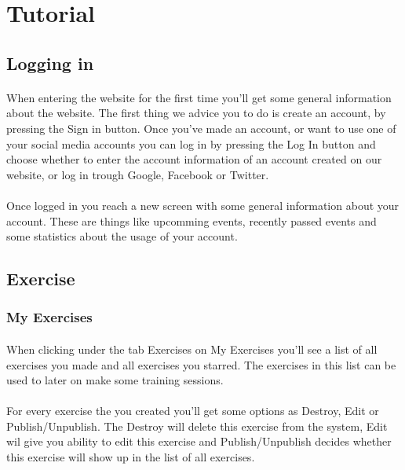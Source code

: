 \documentclass[11pt,a4paper]{scrartcl}
\begin{document}
\section{Tutorial}
\subsection{Logging in}
\paragraph{}When entering the website for the first time you'll get some general information about the website. The first thing we advice you to do is create an account, by pressing the Sign in button. Once you've made an account, or want to use one of your social media accounts you can log in by pressing the Log In button and choose whether to enter the account information of an account created on our website, or log in trough Google, Facebook or Twitter.
\paragraph{}Once logged in you reach a new screen with some general information about your account. These are things like upcomming events, recently passed events and some statistics about the usage of your account.

\subsection{Exercise}
\subsubsection{My Exercises}
\paragraph{}When clicking under the tab Exercises on My Exercises you'll see a list of all exercises you made and all exercises you starred. The exercises in this list can be used to later on make some training sessions.
\paragraph{}For every exercise the you created you'll get some options as Destroy, Edit or Publish/Unpublish. The Destroy will delete this exercise from the system, Edit wil give you ability to edit this exercise and Publish/Unpublish decides whether this exercise will show up in the list of all exercises.
\end{document}
